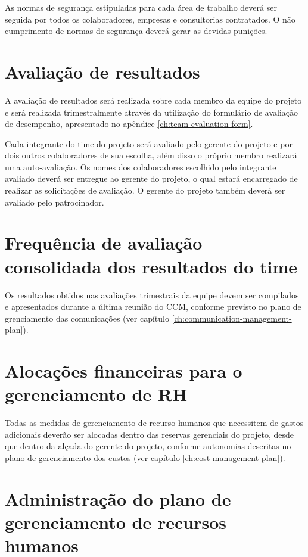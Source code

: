 As normas de segurança estipuladas para cada área de trabalho deverá ser seguida por todos os colaboradores, empresas e consultorias contratados. O não cumprimento de normas de segurança deverá gerar as devidas punições.

\section{Avaliação de resultados}

A avaliação de resultados será realizada sobre cada membro da equipe do projeto e será realizada trimestralmente através da utilização do formulário de avaliação de desempenho, apresentado no apêndice \ref{ch:team-evaluation-form}.

Cada integrante do time do projeto será avaliado pelo gerente do projeto e por dois outros colaboradores de sua escolha, além disso o próprio membro realizará uma auto-avaliação. Os nomes dos colaboradores escolhido pelo integrante avaliado deverá ser entregue ao gerente do projeto, o qual estará encarregado de realizar as solicitações de avaliação. O gerente do projeto também deverá ser avaliado pelo patrocinador.

\section{Frequência de avaliação consolidada dos resultados do time}

Os resultados obtidos nas avaliações trimestrais da equipe devem ser compilados e apresentados durante a última reunião do CCM, conforme previsto no plano de grenciamento das comunicações (ver capítulo \ref{ch:communication-management-plan}).

\section{Alocações financeiras para o gerenciamento de RH}

Todas as medidas de gerenciamento de recurso humanos que necessitem de gastos adicionais deverão ser alocadas dentro das reservas gerenciais do projeto, desde que dentro da alçada do gerente do projeto, conforme autonomias descritas no plano de gerenciamento dos custos (ver capítulo \ref{ch:cost-management-plan}).

\section{Administração do plano de gerenciamento de recursos humanos}

